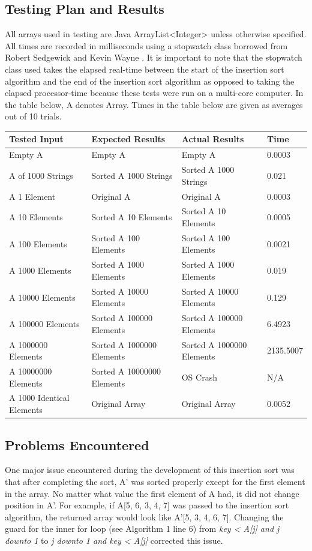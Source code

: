 \documentclass[onecolumn, 12pt, article]{IEEEtran}
\numberwithin{case}{problem}
\numberwithin{condition}{problem}
\numberwithin{condition}{subsection}
\numberwithin{definition}{section}
\theoremstyle{remark}
\numberwithin{question}{problem}
\theoremstyle{plain}
\numberwithin{answer}{problem}
\numberwithin{solution}{section}
\numberwithin{equation}{section}%
\begin{document}
\subsection{Testing Plan and Results}
All arrays used in testing are Java ArrayList<Integer> unless otherwise specified. All times are recorded in milliseconds using a stopwatch class borrowed from Robert Sedgewick and Kevin Wayne \cite{stopwatch}.
It is important to note that the stopwatch class used takes the elapsed real-time between the start of the insertion sort algorithm and the end of the insertion sort algorithm as opposed to taking the elapsed processor-time because these tests were run on a multi-core computer. 
In the table below, A denotes Array. Times in the table below are given as averages out of 10 trials.
\newline
{}
\begin{center}
\begin{tabular}{|l|l|l|l|}
\hline Tested Input & Expected Results & Actual Results & Time \\
\hline Empty A & Empty A & Empty A & 0.0003 \\
\hline A of 1000 Strings & Sorted A 1000 Strings & Sorted A 1000 Strings & 0.021 \\
\hline A 1 Element & Original A & Original A & 0.0003 \\
\hline A 10 Elements & Sorted A 10 Elements & Sorted A 10 Elements & 0.0005 \\
\hline A 100 Elements & Sorted A 100 Elements & Sorted A 100 Elements & 0.0021 \\
\hline A 1000 Elements & Sorted A 1000 Elements & Sorted A 1000 Elements & 0.019 \\
\hline A 10000 Elements & Sorted A 10000 Elements & Sorted A 10000 Elements & 0.129 \\
\hline A 100000 Elements & Sorted A 100000 Elements & Sorted A 100000 Elements & 6.4923 \\
\hline A 1000000 Elements & Sorted A 1000000 Elements & Sorted A 1000000 Elements & 2135.5007 \\
\hline A 10000000 Elements & Sorted A 10000000 Elements & OS Crash & N/A \\
\hline A 1000 Identical Elements & Original Array & Original Array & 0.0052 \\
\hline
\end{tabular}
\end{center}

\subsection{Problems Encountered}
One major issue encountered during the development of this insertion sort was that after completing the sort, A' was sorted properly except for the first element in the array. No matter what value the first element of A had, it did not change position in A'. For example, if A[5, 6, 3, 4, 7] was passed to the insertion sort algorithm, the returned array would look like A'[5, 3, 4, 6, 7]. Changing the guard for the inner for loop (see Algorithm 1 line 6) from \textit{key < A[j] and j downto 1} to \textit{j downto 1 and key < A[j]} corrected this issue.
\end{document}
